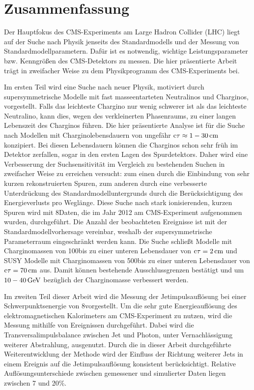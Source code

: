 \chapter*{Zusammenfassung}
Der Hauptfokus des CMS-Experiments am Large Hadron Collider (LHC) liegt auf der Suche nach Physik jenseits des Standardmodells und der Messung von Standardmodellparametern.
Daf\"{u}r ist es notwendig, wichtige Leistungsparameter bzw. Kenngr\"{o}{\ss}en des CMS-Detektors zu messen.
Die hier pr\"{a}sentierte Arbeit tr\"{a}gt in zweifacher Weise zu dem Physikprogramm des CMS-Experiments bei.

Im ersten Teil wird eine Suche nach neuer Physik, motiviert durch supersymmetrische Modelle mit fast masseentarteten Neutralinos und Charginos, vorgestellt.
Falls das leichteste Chargino nur wenig schwerer ist als das leichteste Neutralino, kann dies, wegen des verkleinerten Phasenraums, zu einer langen Lebenszeit des Charginos f\"{u}hren.
Die hier pr\"{a}sentierte Analyse ist f\"{u}r die Suche nach Modellen mit Charginolebensdauern von ungef\"{a}hr $\text{c}\tau\approx 1-30\,\text{cm}$ konzipiert.
Bei diesen Lebensdauern können die Charginos schon sehr fr\"{u}h im Detektor zerfallen, sogar in den ersten Lagen des Spurdetektors.
Daher wird eine Verbesserung der Suchsensitivit\"{a}t im Vergleich zu bestehenden Suchen in zweifacher Weise zu erreichen versucht:
zum einen durch die Einbindung von sehr kurzen rekonstruierten Spuren, zum anderen durch eine verbesserte Unterdr\"{u}ckung des Standardmodelluntergrunds durch die Ber\"{u}cksichtigung des Energieverlusts pro Wegl\"{a}nge.
Diese Suche nach stark ionisierenden, kurzen Spuren wird mit 8\tev Daten, die im Jahr 2012 am CMS-Experiment aufgenommen wurden, durchgef\"{u}hrt.
Die Anzahl der beobachteten Ereignisse ist mit der Standardmodellvorhersage vereinbar, weshalb der supersymmetrische Parameterraum eingeschr\"{a}nkt werden kann.
Die Suche schlie{\ss}t Modelle mit Charginomassen von 100\gev bis zu einer unteren Lebensdauer von $\text{c}\tau=2\,\text{cm}$ und SUSY Modelle mit Charginomassen von 500\gev bis zu einer unteren Lebensdauer von $\text{c}\tau=70\,\text{cm}$ aus.
Damit k\"{o}nnen bestehende Ausschlussgrenzen best\"{a}tigt und um $10-40\,\text{Ge}\kern-0.06667em\text{V}$ bez\"{u}glich der Charginomasse verbessert werden.

Im zweiten Teil dieser Arbeit wird die Messung der Jetimpulsaufl\"{o}sung bei einer Schwerpunktsenergie von 8\tev vorgestellt.
Um die sehr gute Energieaufl\"{o}sung des elektromagnetischen Kalorimeters am CMS-Experiment zu nutzen, wird die Messung mithilfe von \GAMJET Ereignissen durchgef\"{u}hrt.
Dabei wird die Transversalimpulsbalance zwischen Jet und Photon, unter Vernachl\"{a}ssigung weiterer Abstrahlung, ausgenutzt.
Durch die in dieser Arbeit durchgef\"{u}hrte Weiterentwicklung der Methode wird der Einfluss der Richtung weiterer Jets in einem Ereignis auf die Jetimpulsaufl\"{o}sung konsistent ber\"{u}cksichtigt.
Relative Aufl\"{o}sungsunterschiede zwischen gemessener und simulierter Daten liegen zwischen 7 und 20\%.

\cleardoublepage
